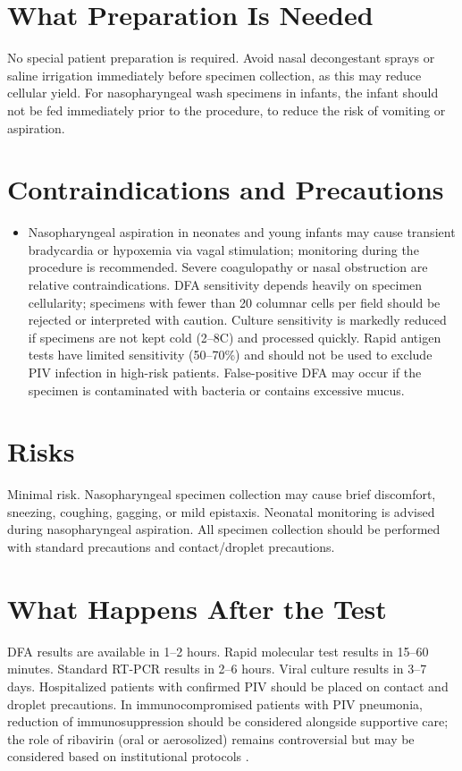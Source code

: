 \section*{What Preparation Is Needed}
No special patient preparation is required. Avoid nasal decongestant sprays or saline irrigation immediately before specimen collection, as this may reduce cellular yield. For nasopharyngeal wash specimens in infants, the infant should not be fed immediately prior to the procedure, to reduce the risk of vomiting or aspiration.

\section*{Contraindications and Precautions}
\begin{itemize}
  \item Nasopharyngeal aspiration in neonates and young infants may cause transient bradycardia or hypoxemia via vagal stimulation; monitoring during the procedure is recommended. Severe coagulopathy or nasal obstruction are relative contraindications. DFA sensitivity depends heavily on specimen cellularity; specimens with fewer than 20 columnar cells per field should be rejected or interpreted with caution. Culture sensitivity is markedly reduced if specimens are not kept cold (2--8\textdegree{}C) and processed quickly. Rapid antigen tests have limited sensitivity (50--70\%) and should not be used to exclude PIV infection in high-risk patients. False-positive DFA may occur if the specimen is contaminated with bacteria or contains excessive mucus.
\end{itemize}
\section*{Risks}
Minimal risk. Nasopharyngeal specimen collection may cause brief discomfort, sneezing, coughing, gagging, or mild epistaxis. Neonatal monitoring is advised during nasopharyngeal aspiration. All specimen collection should be performed with standard precautions and contact/droplet precautions.

\section*{What Happens After the Test}
DFA results are available in 1--2 hours. Rapid molecular test results in 15--60 minutes. Standard RT-PCR results in 2--6 hours. Viral culture results in 3--7 days. Hospitalized patients with confirmed PIV should be placed on contact and droplet precautions. In immunocompromised patients with PIV pneumonia, reduction of immunosuppression should be considered alongside supportive care; the role of ribavirin (oral or aerosolized) remains controversial but may be considered based on institutional protocols \cite{falsey2012current}.

